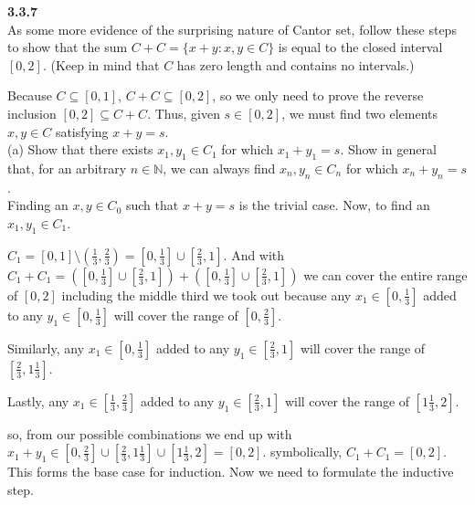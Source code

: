 \textbf{3.3.7}
\\

As some more evidence of the surprising nature of Cantor set, follow these steps to show that the sum
$C + C = \{ x+y : x,y\in C \}$
is equal to the closed interval $[0,2]$.
(Keep in mind that $C$ has zero length and contains no intervals.)

Because $C \subseteq [0,1]$, $C + C \subseteq [0,2]$, so we only need to prove the reverse inclusion
$[0,2] \subseteq C + C$.
Thus, given $s \in  [0,2]$, we must find two elements $x,y \in C$ satisfying $x + y = s$.
\\

(a) Show that there exists $x_1, y_1 \in C_1$ for which $x_1 + y_1 = s$.
Show in general that, for an arbitrary $n \in \mathbb{N}$, we can always find $x_n, y_n \in C_n$
for which $x_n + y_n = s$.
\\

Finding an $x,y \in C_0$ such that $x + y = s$ is the trivial case.
Now, to find an $x_1, y_1 \in C_1$.

$C_1 = [0,1] \setminus \left(\frac{1}{3}, \frac{2}{3}\right) = \left[0, \frac{1}{3}\right] \cup \left[\frac{2}{3}, 1\right]$.
And with $C_1 + C_1 = \left( \left[0, \frac{1}{3}\right] \cup \left[\frac{2}{3}, 1\right] \right) + \left( \left[0, \frac{1}{3}\right] \cup \left[\frac{2}{3}, 1\right] \right)$
we can cover the entire range of $[0,2]$ including the middle third we took out because any $x_1 \in \left[0, \frac{1}{3}\right]$
added to any $y_1 \in \left[0, \frac{1}{3}\right]$ will cover the range of $\left[0, \frac{2}{3}\right]$.

Similarly, any $x_1 \in \left[0, \frac{1}{3}\right]$ added to any $y_1 \in \left[\frac{2}{3}, 1\right]$
will cover the range of $\left[\frac{2}{3}, 1\frac{1}{3}\right]$.

Lastly, any $x_1 \in \left[\frac{1}{3}, \frac{2}{3}\right]$ added to any $y_1 \in \left[\frac{2}{3}, 1\right]$
will cover the range of $\left[1\frac{1}{3}, 2\right]$.

so, from our possible combinations we end up with
$x_1 + y_1 \in \left[0, \frac{2}{3}\right] \cup \left[\frac{2}{3}, 1\frac{1}{3}\right] \cup \left[1\frac{1}{3}, 2\right] = [0,2]$.
symbolically, $C_1 + C_1 = [0,2]$.
This forms the base case for induction.
Now we need to formulate the inductive step.
\\

